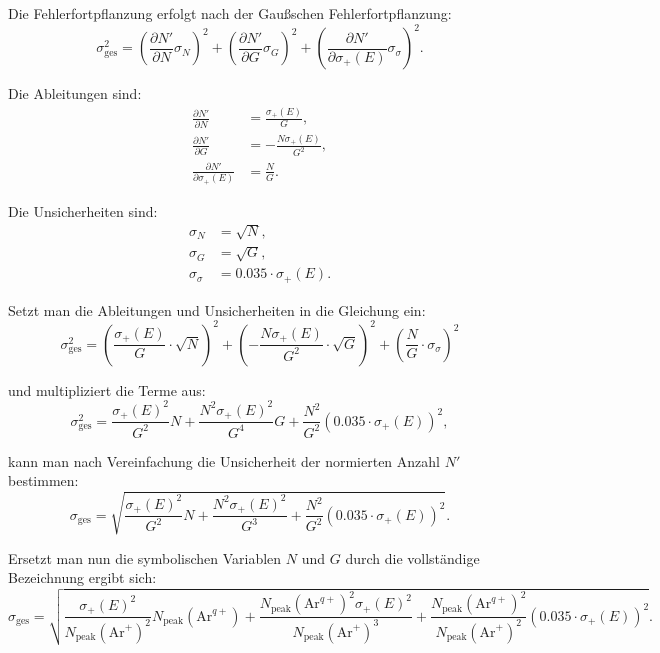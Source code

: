 Die Fehlerfortpflanzung erfolgt nach der Gaußschen Fehlerfortpflanzung:
\begin{equation}
    \sigma_\text{ges}^2 = \left( \frac{\partial N'}{\partial N} \sigma_N \right)^2 +
                     \left( \frac{\partial N'}{\partial G} \sigma_G \right)^2 +
                     \left( \frac{\partial N'}{\partial \sigma_+(E)} \sigma_\sigma \right)^2.
\end{equation}

Die Ableitungen sind:
\begin{align*}
    \frac{\partial N'}{\partial N}&= \frac{\sigma_+(E)}{G}, \\
    \frac{\partial N'}{\partial G}&= -\frac{N \sigma_+(E)}{G^2}, \\
    \frac{\partial N'}{\partial \sigma_+(E)}&= \frac{N}{G}.
\end{align*}

Die Unsicherheiten sind:
\begin{align*}
    \sigma_N &= \sqrt{N}, \\
    \sigma_G &= \sqrt{G}, \\
    \sigma_\sigma &= 0.035 \cdot \sigma_+(E).
\end{align*}

Setzt man die Ableitungen und Unsicherheiten in die Gleichung ein:
\begin{equation}
    \sigma_\text{ges}^2 = \left(\frac{\sigma_+(E)}{G} \cdot \sqrt{N} \right)^2 +
                    \left(-\frac{N \sigma_+(E)}{G^2} \cdot \sqrt{G} \right)^2 +
                    \left(\frac{N}{G} \cdot \sigma_\sigma \right)^2
\end{equation}

und multipliziert die Terme aus:
\begin{equation}
    \sigma_\text{ges}^2 = \frac{\sigma_+(E)^2}{G^2} N + \frac{N^2 \sigma_+(E)^2}{G^4} G + \frac{N^2}{G^2} (0.035 \cdot \sigma_+(E))^2,
\end{equation}

kann man nach Vereinfachung die Unsicherheit der normierten Anzahl $N'$ bestimmen:
\begin{equation}
    \sigma_\text{ges} = \sqrt{\frac{\sigma_+(E)^2}{G^2} N + \frac{N^2 \sigma_+(E)^2}{G^3} + \frac{N^2}{G^2} (0.035 \cdot \sigma_+(E))^2}.
\end{equation}

Ersetzt man nun die symbolischen Variablen $N$ und $G$ durch die vollständige Bezeichnung ergibt sich:
\begin{equation}
    \sigma_\text{ges} = \sqrt{\frac{\sigma_+(E)^2}{N_\text{peak}(\text{Ar}^{+})^2} N_\text{peak}(\text{Ar}^{q+}) + \frac{N_\text{peak}(\text{Ar}^{q+})^2 \sigma_+(E)^2}{N_\text{peak}(\text{Ar}^{+})^3} + \frac{N_\text{peak}(\text{Ar}^{q+})^2}{N_\text{peak}(\text{Ar}^{+})^2} (0.035 \cdot \sigma_+(E))^2}.
\end{equation}

